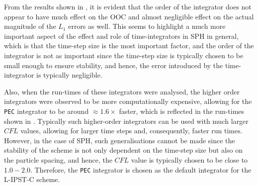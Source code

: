 From the results shown in , it is evident that the order of the integrator does not appear to have much effect on the OOC and almost negligible effect on the actual magnitude of the $L_1$ errors as well.
This seems to highlight a much more important aspect of the effect and role of time-integrators in SPH in general, which is that the time-step size is the most important factor, and the order of the integrator is not as important since the time-step size is typically chosen to be small enough to ensure stability, and hence, the error introduced by the time-integrator is typically negligible.

Also, when the run-times of these integrators were analysed, the higher order integrators were observed to be more computationally expensive, allowing for the \texttt{PEC} integrator to be around $\approx 1.6\times$ faster, which is reflected in the run-times shown in .
Typically such higher-order integrators can be used with much larger $CFL$ values, allowing for larger time steps and, consequently, faster run times. However, in the case of SPH, such generalisations cannot be made since the stability of the scheme is not only dependent on the time-step size but also on the particle spacing, and hence, the $CFL$ value is typically chosen to be close to $1.0-2.0$.
Therefore, the \texttt{PEC} integrator is chosen as the default integrator for the L-IPST-C scheme.

